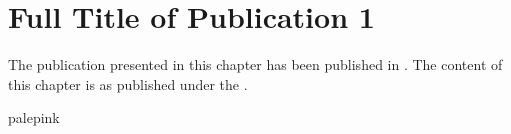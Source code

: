 \chapter[\quad Short Title of Publication 1]{Full Title of Publication 1}\label{chapter:p1}

The publication presented in this chapter has been published in .
The content of this chapter is as published under the .
\vspace{1cm}

\begin{pubboxed}{palepink}
\noindent\cite{placeholderP1} 
\end{pubboxed}

\newpage
% 
